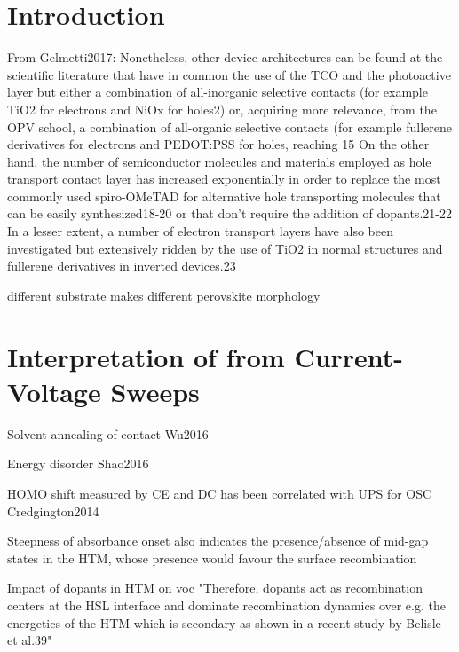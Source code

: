 


\section{Introduction}
From Gelmetti2017:
Nonetheless, other device architectures can be found at the scientific literature that have in common the use of the TCO and the photoactive layer but either a combination of all-inorganic selective contacts (for example TiO2 for electrons and NiOx for holes2) or, acquiring more relevance, from the OPV school, a combination of all-organic selective contacts (for example fullerene derivatives for electrons and PEDOT:PSS for holes, reaching 15 %
On the other hand, the number of semiconductor molecules and materials employed as hole transport contact layer has increased exponentially in order to replace the most commonly used spiro-OMeTAD for alternative hole transporting molecules that can be easily synthesized18-20 or that don’t require the addition of dopants.21-22 In a lesser extent, a number of electron transport layers have also been investigated but extensively ridden by the use of TiO2 in normal structures and fullerene derivatives in inverted devices.23


different substrate makes different perovskite morphology \cite{Tao2017}

\section{Interpretation of  from Current-Voltage Sweeps}


Solvent annealing of contact Wu2016

Energy disorder Shao2016

HOMO shift measured by CE and DC has been correlated with UPS for OSC Credgington2014

Steepness of absorbance onset also indicates the presence/absence of mid-gap states in the HTM, whose presence would favour the surface recombination \cite{Tvingstedt2017}

Impact of dopants in HTM on voc \cite{Correa-Baena2017} "Therefore, dopants act as recombination centers at the HSL interface and dominate recombination dynamics over e.g. the energetics of the HTM which is secondary as shown in a recent study by Belisle et al.39"

